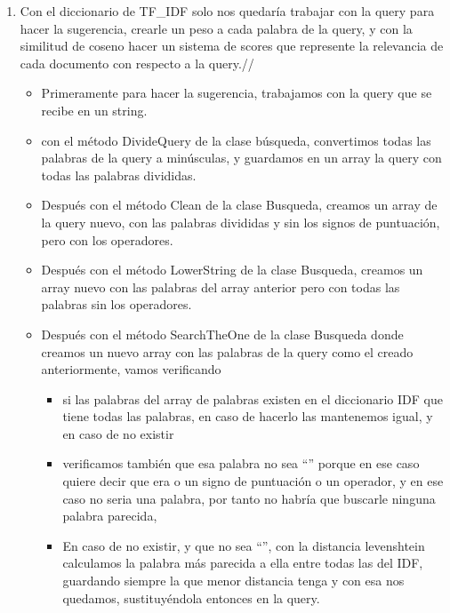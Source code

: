 \documentclass[12pt, a4paper]{article}
\begin{document}
\begin{enumerate}
    \item Con el diccionario de TF\_IDF solo nos quedaría trabajar con la query para hacer la
          sugerencia, crearle un peso a cada palabra de la query, y con la similitud de
          coseno hacer un sistema de scores que represente la relevancia de
          cada documento con respecto a la query.//
          \begin{itemize}
              \item  Primeramente para hacer la sugerencia, trabajamos con la query que
                    se recibe en un string.
              \item con el método DivideQuery de la clase búsqueda,
                    convertimos todas las palabras de la query a minúsculas, y guardamos en un array
                    la query con todas las palabras divididas.
              \item Después con el método Clean de la clase Busqueda,
                    creamos un array de la query nuevo, con las palabras divididas y
                    sin los signos de puntuación, pero con los operadores.
              \item Después con el método LowerString de la clase Busqueda,
                    creamos un array nuevo con las palabras del array anterior pero
                    con todas las palabras sin los operadores.
              \item Después con el método SearchTheOne de la clase Busqueda
                    donde creamos un nuevo array con las palabras de la query
                    como el creado anteriormente, vamos verificando

                    \begin{itemize}
                        \item si las palabras del array de palabras existen en el diccionario IDF
                              que tiene todas las palabras, en caso de hacerlo las mantenemos igual,
                              y en caso de no existir
                        \item verificamos también que esa palabra no sea “”
                              porque en ese caso quiere decir que era o un signo de puntuación o un operador,
                              y en ese caso no seria una palabra, por tanto no habría que buscarle
                              ninguna palabra parecida,
                        \item En caso de no existir, y que no sea “”,
                              con la distancia levenshtein calculamos la palabra más parecida a ella entre todas
                              las del IDF, guardando siempre la que menor distancia tenga y con esa
                              nos quedamos, sustituyéndola entonces en la query.



\end{itemize}
\end{itemize}
\end{enumerate}
\end{document}
